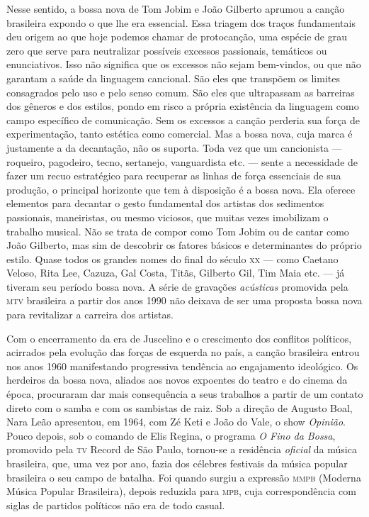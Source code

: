 Nesse sentido, a bossa nova de Tom Jobim e João Gilberto aprumou a
canção brasileira expondo o que lhe era essencial. Essa triagem dos
traços fundamentais deu origem ao que hoje podemos chamar de
protocanção, uma espécie de grau zero que serve para neutralizar
possíveis excessos passionais, temáticos ou enunciativos. Isso não
significa que os excessos não sejam bem-vindos, ou que não garantam a
saúde da linguagem cancional. São eles que transpõem os limites
consagrados pelo uso e pelo senso comum. São eles que ultrapassam as
barreiras dos gêneros e dos estilos, pondo em risco a própria existência
da linguagem como campo específico de comunicação. Sem os excessos a
canção perderia sua força de experimentação, tanto estética como
comercial. Mas a bossa nova, cuja marca é justamente a da decantação,
não os suporta. Toda vez que um cancionista --- roqueiro, pagodeiro,
tecno, sertanejo, vanguardista etc. --- sente a necessidade de fazer um
recuo estratégico para recuperar as linhas de força essenciais de sua
produção, o principal horizonte que tem à disposição é a bossa nova. Ela
oferece elementos para decantar o gesto fundamental dos artistas dos
sedimentos passionais, maneiristas, ou mesmo viciosos, que muitas vezes
imobilizam o trabalho musical. Não se trata de compor como Tom Jobim ou
de cantar como João Gilberto, mas sim de descobrir os fatores básicos e
determinantes do próprio estilo. Quase todos os grandes nomes do final
do século \textsc{xx} --- como Caetano Veloso, Rita Lee, Cazuza, Gal Costa,
Titãs, Gilberto Gil, Tim Maia etc. --- já tiveram seu período
bossa nova. A série de gravações \textit{acústicas} promovida pela \textsc{mtv}
brasileira a partir dos anos 1990 não deixava de ser uma proposta
bossa nova para revitalizar a carreira dos artistas.

Com o encerramento da era de Juscelino e o crescimento dos conflitos
políticos, acirrados pela evolução das forças de esquerda no país, a
canção brasileira entrou nos anos 1960 manifestando progressiva
tendência ao engajamento ideológico. Os herdeiros da bossa nova, aliados
aos novos expoentes do teatro e do cinema da época, procuraram dar mais
consequência a seus trabalhos a partir de um contato direto com o samba
e com os sambistas de raiz. Sob a direção de Augusto Boal, Nara Leão
apresentou, em 1964, com Zé Keti e João do Vale, o show \textit{Opinião}. Pouco
depois, sob o comando de Elis Regina, o programa \textit{O Fino da Bossa},
promovido pela \textsc{tv} Record de São Paulo, tornou-se a residência
\textit{oficial} da música brasileira, que, uma vez por ano, fazia dos
célebres festivais da música popular brasileira o seu campo de batalha.
Foi quando surgiu a expressão \textsc{mmpb} (Moderna Música Popular Brasileira),
depois reduzida para \textsc{mpb}, cuja correspondência com siglas de partidos
políticos não era de todo casual.

